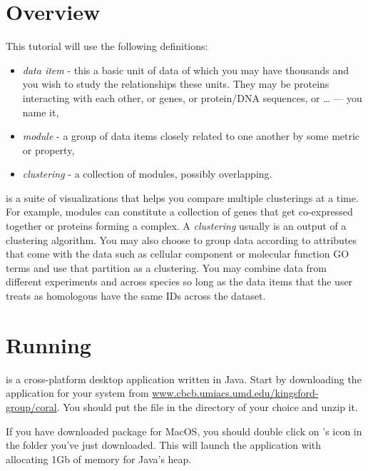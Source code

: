 \section{Overview}

This tutorial will use the following definitions:

\begin{itemize}
\item
  \emph{data item} - this a basic unit of data of which you may have
  thousands and you wish to study the relationships these units. They
  may be proteins interacting with each other, or genes, or protein/DNA
  sequences, or \ldots{} --- you name it,
\item
  \emph{module} - a group of data items closely related to one another
  by some metric or property,
\item
  \emph{clustering} - a collection of modules, possibly overlapping.
\end{itemize}

\coral is a suite of visualizations that helps you compare multiple
clusterings at a time. For example, modules can constitute a collection
of genes that get co-expressed together or proteins forming a complex. A
\emph{clustering} usually is an output of a clustering algorithm. You
may also choose to group data according to attributes that come with the
data such as cellular component or molecular function GO terms and use
that partition as a clustering. You may combine data from different
experiments and across species so long as the data items that the user
treats as homologous have the same IDs across the dataset.

\section{Running \coral}

\coral is a cross-platform desktop application written in Java. Start by 
downloading the application for your system from 
\url{www.cbcb.umiacs.umd.edu/kingsford-group/coral}. You should put the file in
the directory of your choice and unzip it.

If you have downloaded \coral package for MacOS, you should double click on 
\coral's icon in the folder you've just downloaded. This will launch the 
application with allocating 1Gb of memory for Java's heap.

